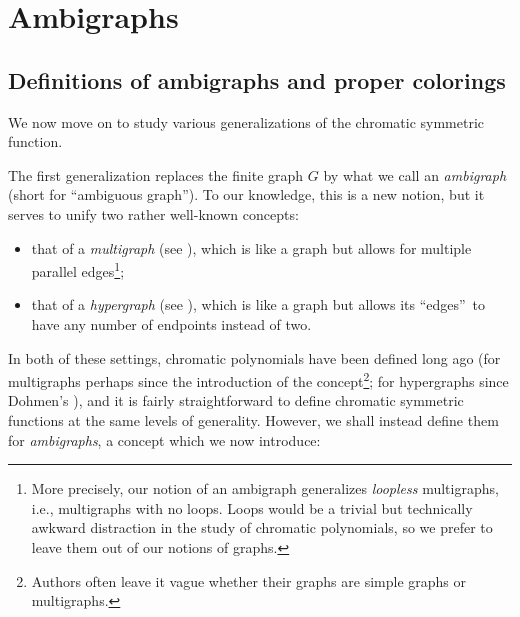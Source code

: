 \documentclass[numbers=enddot,12pt,final,onecolumn,notitlepage]{scrartcl}%
\theoremstyle{definition}
\begin{document}
\section{\label{sec.ambi}Ambigraphs}

\subsection{Definitions of ambigraphs and proper colorings}

We now move on to study various generalizations of the chromatic symmetric function.

The first generalization replaces the finite graph $G$ by what we call an
\emph{ambigraph} (short for \textquotedblleft ambiguous
graph\textquotedblright). To our knowledge, this is a new notion, but it
serves to unify two rather well-known concepts:

\begin{itemize}
\item that of a \emph{multigraph} (see \cite[Definition 6.1.1]{21f-lec6}),
which is like a graph but allows for multiple parallel edges\footnote{More
precisely, our notion of an ambigraph generalizes \emph{loopless} multigraphs,
i.e., multigraphs with no loops. Loops would be a trivial but technically
awkward distraction in the study of chromatic polynomials, so we prefer to
leave them out of our notions of graphs.};

\item that of a \emph{hypergraph} (see \cite[Chapter 17]{Berge73}), which is
like a graph but allows its \textquotedblleft edges\textquotedblright\ to have
any number of endpoints instead of two.
\end{itemize}

In both of these settings, chromatic polynomials have been defined long ago
(for multigraphs perhaps since the introduction of the
concept\footnote{Authors often leave it vague whether their graphs are simple
graphs or multigraphs.}; for hypergraphs since Dohmen's \cite{Dohmen95}), and
it is fairly straightforward to define chromatic symmetric functions at the
same levels of generality. However, we shall instead define them for
\emph{ambigraphs}, a concept which we now introduce:
\end{document}
